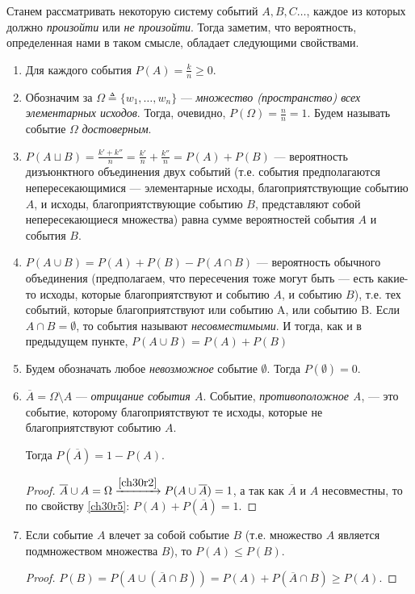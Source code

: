 Станем рассматривать некоторую систему событий $A,B,C\dots $, каждое из которых должно \textit{произойти} или \textit{не произойти}. Тогда заметим, что вероятность, определенная нами в таком смысле, обладает следующими свойствами.
\begin{enumerate}
\item 
Для каждого события $P(A)=\frac{k}{n}\ge 0$.
\item \label{ch30r2}
Обозначим за $\Omega \triangleq \{w_1, \dots,w_n\}$ --- \textit{множество (пространство) всех элементарных исходов}. Тогда, очевидно, $P(\Omega)=\frac{n}{n}=1$. Будем называть событие $\Omega$ \textit{достоверным}. 

\item 
$P(A\sqcup B)=\frac{k'+k''}{n}=\frac{k'}{n}+\frac{k''}{n}=P(A)+P(B)$ --- вероятность дизъюнктного объединения двух событий (т.е. события предполагаются непересекающимися --- элементарные исходы, благоприятствующие событию $A$, и исходы, благоприятствующие событию $B$, представляют собой непересекающиеся множества) равна сумме вероятностей события $A$ и события $B$.
\item \label{ch30r5}
$P(A\cup B)=P(A)+P(B)-P(A\cap B)$ --- вероятность обычного объединения (предполагаем, что пересечения тоже могут быть --- есть какие-то исходы, которые благоприятствуют и событию $A$, и событию $B$), т.е. тех событий, которые благоприятствуют или событию A, или событию B. Если $A\cap B=\emptyset$, то события называют \textit{несовместимыми}. И тогда, как и в предыдущем пункте, $P(A\cup B)=P(A)+P(B)$
\item
Будем обозначать любое \textit{невозможное} событие $\emptyset$. Тогда $P(\emptyset)=0$. 

\item
$\overline{A}=\Omega\setminus A$ --- \textit{отрицание события $A$}. Событие, \textit{противоположное A}, --- это событие, которому благоприятствуют те исходы, которые не благоприятствуют событию $A$. 

Тогда $P(\overline{A})=1-P(A)$.
\begin{proof}
$\overline{A}\cup A=\Omega\xrightarrow{\ref{ch30r2}}P(A\cup\overline{A}) = 1$, а так как $\overline{A}$ и $A$ несовместны, то по свойству \ref{ch30r5}:  $P(A)+P(\overline{A}) = 1$.
\end{proof}

\item
Если событие $A$ влечет за собой событие $B$ (т.е. множество $A$ является подмножеством множества $B$), то $P(A)\le P(B)$.
\begin{proof}
$P(B)=P(A\cup (\overline{A}\cap B))=P(A)+P(\overline{A}\cap B)\ge P(A).$
\end{proof}


\end{enumerate}
